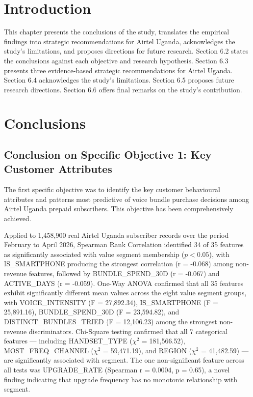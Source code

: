 
\section{Introduction}

This chapter presents the conclusions of the study, translates the empirical findings into strategic recommendations for Airtel Uganda, acknowledges the study's limitations, and proposes directions for future research. Section 6.2 states the conclusions against each objective and research hypothesis. Section 6.3 presents three evidence-based strategic recommendations for Airtel Uganda. Section 6.4 acknowledges the study's limitations. Section 6.5 proposes future research directions. Section 6.6 offers final remarks on the study's contribution.


\section{Conclusions}


\subsection{Conclusion on Specific Objective 1: Key Customer Attributes}

The first specific objective was to identify the key customer behavioural attributes and patterns most predictive of voice bundle purchase decisions among Airtel Uganda prepaid subscribers. This objective has been comprehensively achieved.

Applied to 1,458,900 real Airtel Uganda subscriber records over the period February to April 2026, Spearman Rank Correlation identified 34 of 35 features as significantly associated with value segment membership ($p < 0.05$), with IS\_SMARTPHONE producing the strongest correlation (r = -0.068) among non-revenue features, followed by BUNDLE\_SPEND\_30D (r = -0.067) and ACTIVE\_DAYS (r = -0.059). One-Way ANOVA confirmed that all 35 features exhibit significantly different mean values across the eight value segment groups, with VOICE\_INTENSITY (F = 27,892.34), IS\_SMARTPHONE (F = 25,891.16), BUNDLE\_SPEND\_30D (F = 23,594.82), and DISTINCT\_BUNDLES\_TRIED (F = 12,106.23) among the strongest non-revenue discriminators. Chi-Square testing confirmed that all 7 categorical features --- including HANDSET\_TYPE ($\chi^2$ = 181,566.52), MOST\_FREQ\_CHANNEL ($\chi^2$ = 59,471.19), and REGION ($\chi^2$ = 41,482.59) --- are significantly associated with segment. The one non-significant feature across all tests was UPGRADE\_RATE (Spearman r = 0.0004, p = 0.65), a novel finding indicating that upgrade frequency has no monotonic relationship with segment.

